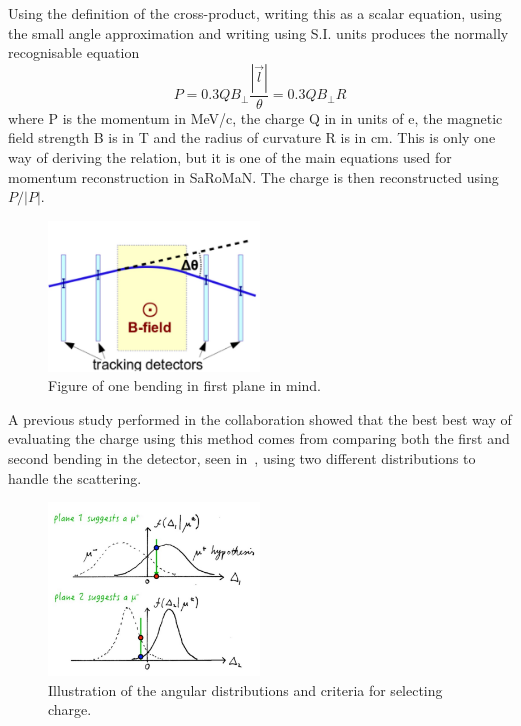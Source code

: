 Using the definition of the cross-product, writing this as a scalar equation, using the small angle approximation and writing using S.I. units produces the normally recognisable equation
\begin{equation}
P = 0.3 QB_\bot \frac{|\vec{l}|}{\theta}=0.3 QB_\bot R
\end{equation}
where P is the momentum in MeV/c, the charge Q in in units of e, the magnetic field strength B is in T and the radius of curvature R is in cm. This is only one way of deriving the relation, but it is one of the main equations used for momentum reconstruction in SaRoMaN. The charge is then reconstructed using $P/|P|$. 

\begin{figure}[h!]
\centering
\includegraphics[width=0.5\textwidth]{figures/lowP/scattering.jpeg}
\caption{Figure of one bending in first plane in mind.}
\label{fig:Scattering}
\end{figure}

A previous study performed in the collaboration showed that the best best way of evaluating the charge using this method comes from comparing both the first and second bending in the detector, seen in~, using two different distributions to handle the scattering.

\begin{figure}[h!]
\centering
\includegraphics[width=0.5\textwidth]{figures/lowP/null.jpg}
\caption{Illustration of the angular distributions and criteria for selecting charge.}
\label{fig:NullHyp}
\end{figure}

